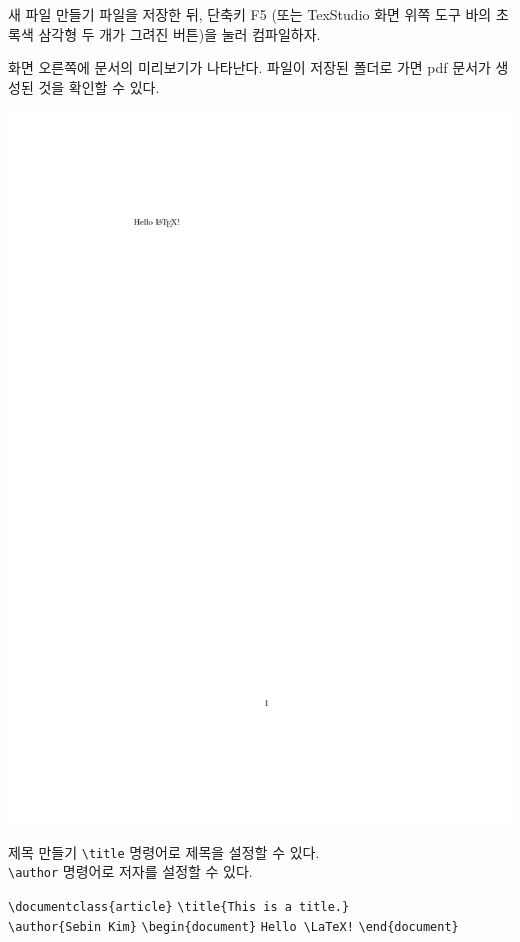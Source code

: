 \documentclass[12pt]{gshs_lecture}
\newenvironment{codeblock}[1]{
	\begin{block}{#1}
		\setstretch{1.0}
		\begin{small}
}{
		\end{small}
	\end{block}
}
\begin{document}
\begin{frame}[t]{새 파일 만들기}
	파일을 저장한 뒤, 단축키 F5 (또는 TexStudio 화면 위쪽 도구 바의 초록색 삼각형 두 개가 그려진 버튼)을 눌러 컴파일하자.
	
	\vskip 1pc
	
	화면 오른쪽에 문서의 미리보기가 나타난다. 파일이 저장된 폴더로 가면 pdf 문서가 생성된 것을 확인할 수 있다.
	
	\begin{framed}
		\includegraphics[width=\textwidth,trim={4cm 23.5cm 4cm 3cm},clip]{./pdfs/ex2.pdf}
	\end{framed}
	
\end{frame}

\begin{frame}[t]{제목 만들기}
	\texttt{\textbackslash title} 명령어로 제목을 설정할 수 있다. \\
	\texttt{\textbackslash author} 명령어로 저자를 설정할 수 있다.
	\vskip 1pc
	\begin{codeblock}{}
		\texttt{\textbackslash documentclass\{article\}}
		\vskip 1pc
		{\color{red}
		\texttt{\textbackslash title\{This is a title.\}} \\
		\texttt{\textbackslash author\{Sebin Kim\}}
		}
		\vskip 1pc
		\texttt{\textbackslash begin\{document\}}
		\vskip 1pc
		\texttt{Hello \textbackslash LaTeX!}
		\vskip 1pc
		\texttt{\textbackslash end\{document\}}
	\end{codeblock}
\end{frame}
\end{document}
